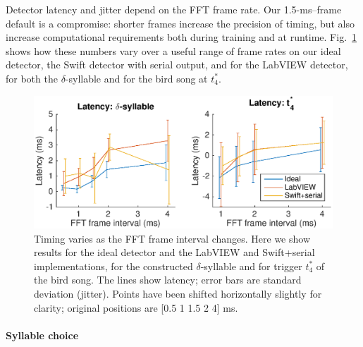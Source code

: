 \documentclass[10pt,letterpaper]{article}
\newcommand\fig[1]{Fig.~\ref{#1}}
\renewcommand{\subsubsection}[1]{\paragraph{#1}}
\begin{document}
Detector latency and jitter depend on the FFT frame rate.  Our
1.5-ms--frame default is a compromise: shorter frames increase the
precision of timing, but also increase computational requirements both
during training and at runtime.  \fig{fig:TimingVsFrame} shows how
these numbers vary over a useful range of frame rates on our ideal
detector, the Swift detector with serial output, and for the LabVIEW
detector, for both the $\delta$-syllable and for the bird song at
$t^*_4$.

\begin{figure}
  \includegraphics[width=\textwidth]{Fig4}
  \caption{Timing varies as the FFT frame interval changes.  Here we
    show results for the ideal detector and the LabVIEW and
    Swift+serial implementations, for the constructed
    $\delta$-syllable and for trigger $t^*_4$ of the bird song.  The
    lines show latency; error bars are standard deviation (jitter).  Points have
    been shifted horizontally slightly for clarity; original positions are [0.5 1
      1.5 2 4] ms.}
  \label{fig:TimingVsFrame}
\end{figure}

\subsubsection{Syllable choice}
\end{document}
